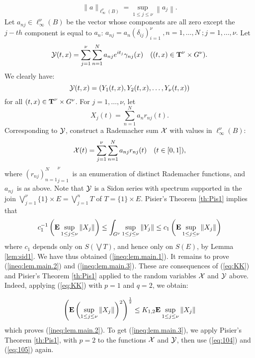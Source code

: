 $$\|a\|_{\ell_\infty^\nu (B)}=\sup_{1\leq j\leq\nu}\left\|a_j\right\| .$$
Let $a_{nj} \in\ell_\infty^\nu (B)$ be the vector whose components are
all zero except the $j-th$ component is equal to $a_n$:
$a_{nj}=a_n\left(\delta_{ij}\right)^\nu_{i=1}\ , n= 1,\ldots , N\ ;
j=1,\ldots , \nu.$  Let
\begin{eqnarray}
{\cal Y}(t, x) = \sum_{j=1}^\nu\sum_{n=1}^Na_{nj}e^{it_j}\gamma_{nj}(x) &
&
((t, x)\in {\hbox{\bf T}}^\nu\times G^\nu).
\label{eq:101}
\end{eqnarray}
We clearly have:
\begin{equation}
{\cal Y}(t, x) = \left(Y_1(t, x), Y_2(t, x),\ldots , Y_\nu(t, x)\right)
\label{eq:102}
\end{equation}
for all $(t, x) \in {\hbox{\bf T}}^\nu\times G^\nu$.  
For $j = 1,\ldots,\nu$, let
$$X_j(t)=\sum_{n=1}^Na_nr_{nj}(t).$$
Corresponding to ${\cal Y}$,
construct a 
Rademacher sum
${\cal X}$ with values in $\ell_\infty^\nu (B)$:
\begin{eqnarray}
{\cal X}(t) = \sum_{j=1}^\nu\sum_{n=1}^Na_{nj}r_{nj}(t) &  & (t\in
[0 , 1]),
\label{eq:103}
\end{eqnarray}
where ${{(r_{nj})_{n=1}^N}}_{j=1}^\nu$\ is an enumeration of distinct
Rademacher functions, and $a_{nj}$\ is as above.  
Note that ${\cal Y}$ is a Sidon series with
spectrum supported in the join $\bigvee_{j=1}^\nu \{1\}\times E =
\bigvee_{j=1}^n T$ of
$T= \{1\}\times E$. Pisier's Theorem \ref{th:Pis1} implies that
\begin{equation}
c_1^{-1}\left( {\bf E}\sup_{1\leq j\leq\nu}\left\| X_j\right\|\right)
\leq
\int_{G^\nu}\sup_{1\leq j\leq\nu}\left\| Y_j\right\|
\leq
c_1\left( {\bf E}\sup_{1\leq j\leq\nu}\left\| X_j\right\|\right)
\label{eq:104}
\end{equation}
where $c_1$ depends only on $S\left(\bigvee T\right)$, and hence only on
$S(E)$, by Lemma \ref{lem:sid1}.  We have thus obtained
(\ref{ineq:lem.main.1}). It remains
to prove (\ref{ineq:lem.main.2}) and (\ref{ineq:lem.main.3}).  These are
consequences of (\ref{eq:KK}) and Pisier's Theorem \ref{th:Pis1} applied
to the random variables ${\cal X}$ and ${\cal Y}$ above.  Indeed,
applying
(\ref{eq:KK}) with $p=1$ and $q=2$, we obtain:


\begin{equation}
\left( {\bf E}\left(\sup_{1\leq j\leq\nu}\left\|
X_j\right\|\right)^2\right)^{\frac{1}{2}}
\leq
K_{1,2}{\bf E}\sup_{1\leq j\leq\nu}\left\| X_j\right\|
\label{eq:105}
\end{equation}
which proves (\ref{ineq:lem.main.2}).  To get (\ref{ineq:lem.main.3}), we
apply Pisier's Theorem \ref{th:Pis1}, with $p=2$ to the functions ${\cal
X}$ and ${\cal Y}$, then use (\ref{eq:104}) and (\ref{eq:105}) again.


